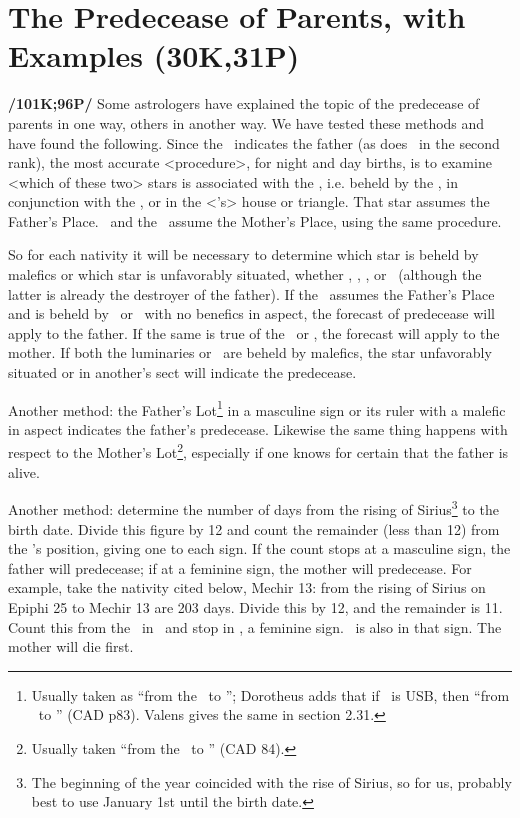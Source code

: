 \section{The Predecease of Parents, with Examples (30K,31P)}
\textbf{/101K;96P/} Some astrologers have explained the topic of the predecease of parents in one way, others in another
way. We have tested these methods and have found the following. Since the \Sun\, indicates the father (as does \Saturn\, in the second rank), the most accurate <procedure>, for night and day births, is to examine
<which of these two> stars is associated  with the \Moon, i.e. beheld by the \Moon, in conjunction with the \Moon, or in the <\Moon’s> house or triangle. That star assumes the Father’s Place. \Venus\, and the \Moon\, assume the Mother’s Place, using the same procedure. 

So for each nativity it will be necessary to determine which star is beheld by malefics or which star is unfavorably situated, whether \Sun, \Moon, \Venus, or \Saturn\, (although the latter is already the destroyer of the father). If the \Sun\, assumes the Father’s Place and is beheld by \Mars\, or \Saturn\, with no benefics in aspect, the forecast of predecease will apply to the father. If the same is true of the \Moon\, or \Venus, the forecast will apply to the mother. If both the luminaries or \Venus\, are beheld by malefics, the star unfavorably situated or in another’s sect will indicate the predecease.

Another method: the Father’s Lot\footnote{Usually taken as ``from the \Sun\, to \Saturn''; Dorotheus adds that if \Saturn\, is USB, then ``from \Mars\, to \Jupiter'' (CAD p83). Valens gives the same in section 2.31.} in a masculine sign or its ruler with a malefic in aspect indicates the father’s predecease. Likewise the same thing happens with respect to the Mother’s Lot\footnote{Usually taken ``from the \Moon\, to \Venus'' (CAD 84).}, especially if one knows for certain that the father is alive.

Another method: determine the number of days from the rising of Sirius\footnote{The beginning of the year coincided with the rise of Sirius, so for us, probably best to use January 1st until the birth date.} to the birth date. Divide this figure by 12 and count the remainder (less than 12) from the \Moon’s position, giving one to each sign. If the count stops at a masculine sign, the father will predecease; if at a feminine sign, the mother will
predecease. For example, take the nativity cited below, Mechir 13: from the rising of Sirius on Epiphi 25 to Mechir 13 are 203 days. Divide this by 12, and the remainder is 11. Count this from the \Moon\, in \Scorpio\, and stop in \Virgo, a feminine sign. \Mars\, is also in that sign. The mother will die first.

